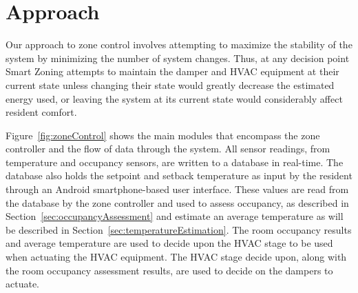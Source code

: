 \section{Approach}

Our approach to zone control involves attempting to maximize the stability of
the system by minimizing the number of system changes. Thus, at any decision
point Smart Zoning attempts to maintain the damper and HVAC equipment at their
current state unless changing their state would greatly decrease the estimated
energy used, or leaving the system at its current state would considerably
affect resident comfort.

\begin{figure}[t]
\end{figure}

Figure~\ref{fig:zoneControl} shows the main modules that encompass the zone
controller and the flow of data through the system. All sensor readings, from
temperature and occupancy sensors, are written to a database in real-time. The
database also holds the setpoint and setback temperature as input by the
resident through an Android smartphone-based user interface. These values are
read from the database by the zone controller and used to assess occupancy, as
described in Section~\ref{sec:occupancyAssessment} and estimate an average
temperature as will be described in Section~\ref{sec:temperatureEstimation}. The
room occupancy results and average temperature are used to decide upon the HVAC
stage to be used when actuating the HVAC equipment. The HVAC stage decide upon,
along with the room occupancy assessment results, are used to decide on the
dampers to actuate.

